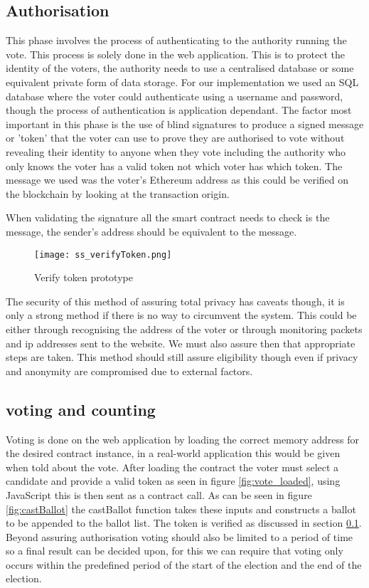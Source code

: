 \documentclass{entcs}
\begin{document}
\subsection{Authorisation}\label{sec: Auth}
This phase involves the process of authenticating to the authority running the vote. This process is solely done in the web application. This is to protect the identity of the voters, the authority needs to use a centralised database or some equivalent private form of data storage. For our implementation we used an SQL database where the voter could authenticate using a username and password, though the process of authentication is application dependant. The factor most important in this phase is the use of blind signatures to produce a signed message or 'token' that the voter can use to prove they are authorised to vote without revealing their identity to anyone when they vote including the authority who only knows the voter has a valid token not which voter has which token. The message we used was the voter's Ethereum address as this could be verified on the blockchain by looking at the transaction origin.

When validating the signature all the smart contract needs to check is the message, the sender's address should be equivalent to the message.

\begin{figure}[h!]
    \centering
    \texttt{[image: ss\_verifyToken.png]}
    \caption{Verify token prototype}
    \label{fig:verifyToken}
\end{figure}

The security of this method of assuring total privacy has caveats though, it is only a strong method if there is no way to circumvent the system. This could be either through recognising the address of the voter or through monitoring packets and ip addresses sent to the website. We must also assure then that appropriate steps are taken.
This method should still assure eligibility though even if privacy and anonymity are compromised due to external factors.

\subsection{voting and counting} \label{sec: voting and counting}
Voting is done on the web application by loading the correct memory address for the desired contract instance, in a real-world application this would be given when told about the vote. After loading the contract the voter must select a candidate and provide a valid token as seen in figure \ref{fig:vote_loaded}, using JavaScript this is then sent as a contract call. As can be seen in figure \ref{fig:castBallot} the castBallot function takes these inputs and constructs a ballot to be appended to the ballot list. The token is verified as discussed in section \ref{sec: Auth}. 
Beyond assuring authorisation voting should also be limited to a period of time so a final result can be decided upon, for this we can require that voting only occurs within the predefined period of the start of the election and the end of the election.
\end{document}
